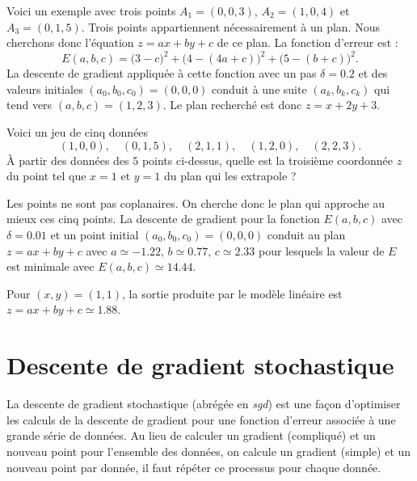 \documentclass[11pt,class=report,crop=false]{standalone}
\begin{document}
\begin{exemple}
Voici un exemple avec trois points $A_1=(0,0,3)$, $A_2=(1,0,4)$ et $A_3=(0,1,5)$.
Trois points appartiennent nécessairement à un plan. Nous cherchons donc l'équation $z=ax+by+c$ de ce plan.
La fonction d'erreur est :
$$E(a,b,c) = 
\big(3 - c\big)^2
+ \big(4 - (4a+c)\big)^2
+ \big(5 - (b+c)\big)^2.$$
La descente de gradient appliquée à cette fonction avec un pas $\delta = 0.2$ et
des valeurs initiales $(a_0,b_0,c_0)=(0,0,0)$ conduit à une suite $(a_k,b_k,c_k)$ qui tend vers $(a,b,c) = (1,2,3)$. Le plan recherché est donc $z=x+2y+3$.
\end{exemple}


\begin{exemple}
Voici un jeu de cinq données
$$(1,0,0),\quad (0,1,5),\quad (2,1,1),\quad (1,2,0),\quad (2,2,3).$$
\`A partir des données des $5$ points ci-dessus, quelle est la troisième coordonnée $z$ du point tel que $x=1$ et $y=1$ du plan qui les extrapole ?


Les points ne sont pas coplanaires. On cherche donc le plan qui approche au mieux ces cinq points.
La descente de gradient pour la fonction $E(a,b,c)$ avec $\delta=0.01$ et un point initial $(a_0,b_0,c_0)=(0,0,0)$ conduit au plan $z=ax+by+c$ avec $a\simeq-1.22$, $b\simeq0.77$, $c\simeq 2.33$ pour lesquels la valeur de $E$ est minimale avec $E(a,b,c) \simeq 14.44$.

Pour $(x,y) = (1,1)$, la sortie produite par le modèle linéaire est $z = ax+by+c \simeq 1.88$.
\end{exemple}



\section{Descente de gradient stochastique}


La descente de gradient stochastique (abrégée en \emph{sgd}) est une façon d'optimiser les calculs
de la descente de gradient pour une fonction d'erreur associée à une grande série de données.
Au lieu de calculer un gradient (compliqué) et un nouveau point pour l'ensemble des données, on calcule un gradient (simple) et un nouveau point par donnée, il faut répéter ce processus pour chaque donnée.
\end{document}

